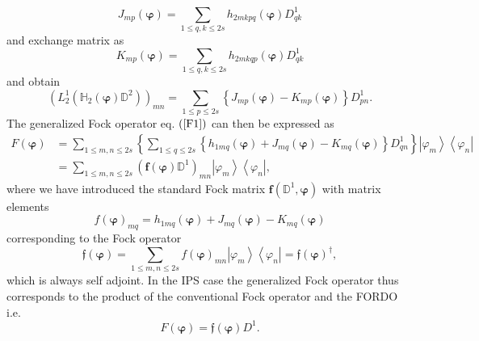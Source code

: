 \documentclass[titlepage]{article}%
\begin{document}
\begin{equation}
J_{mp}\left(  \bm{\varphi}\right)  =\sum_{1\leq q,k\leq2s}h_{2mkpq}\left(
\bm{\varphi}\right)  D_{qk}^{1}%
\end{equation}
and exchange matrix as
\begin{equation}
K_{mp}\left(  \bm{\varphi}\right)  =\sum_{1\leq q,k\leq2s}h_{2mkqp}\left(
\bm{\varphi}\right)  D_{qk}^{1}%
\end{equation}
and obtain
\begin{equation}
\left(  L_{2}^{1}\left(  \mathbb{H}_{2}\left(  \bm{\varphi}\right)
\mathbb{D}^{2}\right)  \right)  _{mn}=\sum_{1\leq p\leq2s}\left\{
J_{mp}\left(  \bm{\varphi}\right)  -K_{mp}\left(  \bm{\varphi}\right)
\right\}  D_{pn}^{1}.
\end{equation}
The generalized Fock operator eq. $\left(  \ref{F1}\right)  $ can then be
expressed as
\begin{align}
F\left(  \bm{\varphi}\right)   &  =\sum_{1\leq m,n\leq2s}\left\{  \sum_{1\leq
q\leq2s}\left\{  h_{1mq}\left(  \bm{\varphi}\right)  +J_{mq}\left(
\bm{\varphi}\right)  -K_{mq}\left(  \bm{\varphi }\right)  \right\}  D_{qn}%
^{1}\right\}  \left\vert \varphi_{m}\right\rangle \left\langle \varphi
_{n}\right\vert \nonumber\\
&  =\sum_{1\leq m,n\leq2s}\left(  \bm{f}\left(  \bm{\varphi}\right)
\mathbb{D}^{1}\right)  _{mn}\left\vert \varphi_{m}\right\rangle \left\langle
\varphi_{n}\right\vert ,
\end{align}
where we have introduced the standard Fock matrix $\bm{f}\left(
\mathbb{D}^{1},\bm{\varphi}\right)  $ with matrix elements
\begin{equation}
f\left(  \bm{\varphi}\right)  _{mq}=h_{1mq}\left(  \bm{\varphi }\right)
+J_{mq}\left(  \bm{\varphi}\right)  -K_{mq}\left(  \bm{\varphi}\right)
\end{equation}
corresponding to the Fock operator
\begin{equation}
\mathfrak{f}\left(  \bm{\varphi}\right)  =\sum_{1\leq m,n\leq2s}f\left(
\bm{\varphi}\right)  _{mn}\left\vert \varphi_{m}\right\rangle \left\langle
\varphi_{n}\right\vert =\mathfrak{f}\left(  \bm{\varphi}\right)  ^{\dagger},
\end{equation}
which is always self adjoint. In the IPS case the generalized Fock operator
thus corresponds to the product of the conventional Fock operator and the
FORDO i.e.
\begin{equation}
F\left(  \bm{\varphi}\right)  =\mathfrak{f}\left(  \bm{\varphi }\right)
D^{1}.
\end{equation}
\end{document}

